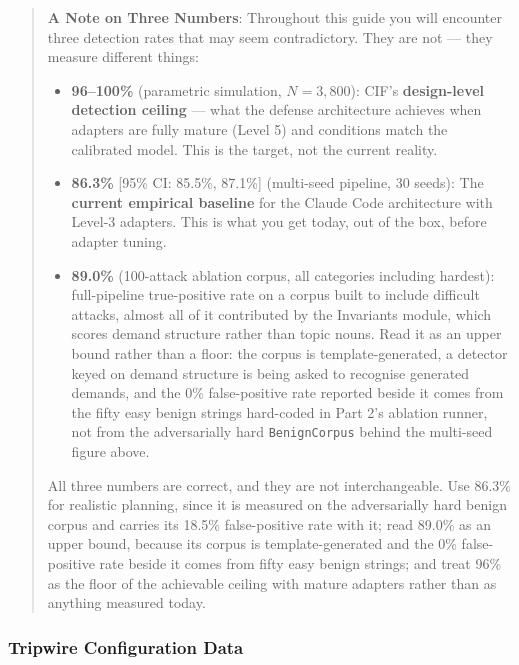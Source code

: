 \documentclass[
]{article}
\providecommand{\tightlist}{%
  \setlength{\itemsep}{0pt}\setlength{\parskip}{0pt}}
\begin{document}
\begin{quote}
\textbf{A Note on Three Numbers}: Throughout this guide you will
encounter three detection rates that may seem contradictory. They are
not --- they measure different things:

\begin{itemize}
\tightlist
\item
  \textbf{96--100\%} (parametric simulation, \(N=3{,}800\)): CIF's
  \textbf{design-level detection ceiling} --- what the defense
  architecture achieves when adapters are fully mature (Level 5) and
  conditions match the calibrated model. This is the target, not the
  current reality.
\item
  \textbf{86.3\%} {[}95\% CI: 85.5\%, 87.1\%{]} (multi-seed pipeline, 30
  seeds): The \textbf{current empirical baseline} for the Claude Code
  architecture with Level-3 adapters. This is what you get today, out of
  the box, before adapter tuning.
\item
  \textbf{89.0\%} (100-attack ablation corpus, all categories including
  hardest): full-pipeline true-positive rate on a corpus built to
  include difficult attacks, almost all of it contributed by the
  Invariants module, which scores demand structure rather than topic
  nouns. Read it as an upper bound rather than a floor: the corpus is
  template-generated, a detector keyed on demand structure is being
  asked to recognise generated demands, and the 0\% false-positive rate
  reported beside it comes from the fifty easy benign strings hard-coded
  in Part 2's ablation runner, not from the adversarially hard
  \texttt{BenignCorpus} behind the multi-seed figure above.
\end{itemize}

All three numbers are correct, and they are not interchangeable. Use
86.3\% for realistic planning, since it is measured on the adversarially
hard benign corpus and carries its 18.5\% false-positive rate with it;
read 89.0\% as an upper bound, because its corpus is template-generated
and the 0\% false-positive rate beside it comes from fifty easy benign
strings; and treat 96\% as the floor of the achievable ceiling with
mature adapters rather than as anything measured today.
\end{quote}

\subsubsection{Tripwire Configuration
Data}\label{tripwire-configuration-data}
\end{document}
